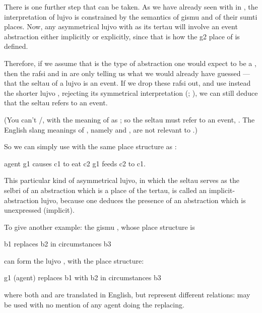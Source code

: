 There is one further step that can be taken. As we have already
    seen with  in , the
    interpretation of lujvo is constrained by the semantics of
    gismu and of their sumti places. Now, any asymmetrical lujvo
    with  as its tertau will involve an event abstraction
    either implicitly or explicitly, since that is how the g2 place
    of  is defined. 

Therefore, if we assume that  is the type of
    abstraction one would expect to be a , then the
    rafsi  and  in  are only telling
    us what we would already have guessed --- that the seltau of a
     lujvo is an event. If we drop these rafsi out, and
    use instead the shorter lujvo , rejecting its
    symmetrical interpretation (;
    ), we can still deduce that the seltau refers
    to an event.

(You can't /, with the
    meaning of  as ; so the seltau
    must refer to an event, . The English slang
    meanings of , namely 
    and , are not relevant to
    .)

So we can simply use  with the same place
    structure as :
\begin{example}
agent g1 causes c1 to eat c2\n
g1 feeds c2 to c1.
\end{example}

This particular kind of asymmetrical lujvo, in which the seltau
    serves as the selbri of an abstraction which is a place of the
    tertau, is called an implicit-abstraction lujvo, because one
    deduces the presence of an abstraction which is unexpressed
    (implicit). 

To give another example: the gismu , whose place
    structure is
\begin{example}
b1 replaces b2 in circumstances b3
\end{example}

{\noindent}can form the lujvo , with the place structure:
\begin{example}
g1 (agent) replaces b1 with b2 in circumstances b3
\end{example}

{\noindent}where both  and  are translated 
    in English, but represent different relations:  may be
    used with no mention of any agent doing the replacing. 


